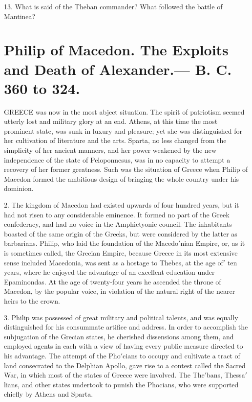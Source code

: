 \documentclass[openany,a4paper]{memoir}
\begin{document}
13. What is said of the Theban commander? What 
followed the battle of Mantinea? 


\chapter{Philip of Macedon. The Exploits and Death of 
Alexander.--- B. C. 360 to 324.}

GREECE was now in the most abject situation. The 
spirit of patriotism seemed utterly lost and military 
glory at an end. Athens, at this time the most prominent 
state, was sunk in luxury and pleasure; yet she was distinguished for her cultivation of literature and the arts. 
Sparta, no less changed from the simplicity of her ancient 
manners, and her power weakened by the new independence 
of the state of Peloponnesus, was in no capacity to attempt 
a recovery of her former greatness. Such was the situation 
of Greece when Philip of Macedon formed the ambitious 
design of bringing the whole country under his dominion. 

2. The kingdom of Macedon had existed upwards of four 
hundred years, but it had not risen to any considerable eminence. It formed no part of the Greek confederacy, and had no 
voice in the Amphictyonic council. The inhabitants boasted 
of the same origin of the Greeks, but were considered by the 
latter as barbarians. Philip, who laid the foundation of the 
Macedo$'$nian Empire, or, as it is sometimes called, the Grecian 
Empire, because Greece in its most extensive sense included 
Macedonia, was sent as a hostage to Thebes, at the age of$'$ 
ten years, where he enjoyed the advantage of an excellent education under Epaminondas. At the age of twenty-four years 
he ascended the throne of Macedon, by the popular voice, in 
violation of the natural right of the nearer heirs to the crown. 

3. Philip was possessed of great military and political 
talents, and was equally distinguished for his consummate 
artifice and address. In order to accomplish the subjugation 
of the Grecian states, he cherished dissensions among them, 
and employed agents in each with a view of having every 
public measure directed to his advantage. The attempt of 
the Pho$'$cians to occupy and cultivate a tract of land consecrated to the Delphian Apollo, gave rise to a contest called 
the Sacred War, in which most of the states of Greece were 
involved. The The$'$bans, Thessa$'$lians, and other states undertook to punish the Phocians, who were supported chiefly 
by Athens and Sparta. 
\end{document}

